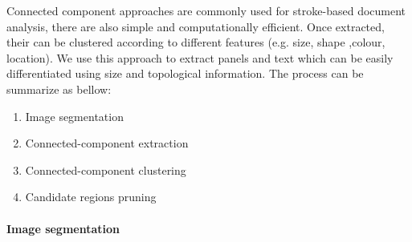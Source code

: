 Connected component approaches are commonly used for stroke-based document analysis, there are also simple and computationally efficient.
Once extracted, their can be clustered according to different features (e.g. size, shape ,colour, location).
We use this approach to extract panels and text which can be easily differentiated using size and topological information.
The process can be summarize as bellow:
  \begin{enumerate}
	\item Image segmentation
	\item Connected-component extraction
	\item Connected-component clustering
	\item Candidate regions pruning
  \end{enumerate}


\paragraph{Image segmentation} %
\label{par:process}

